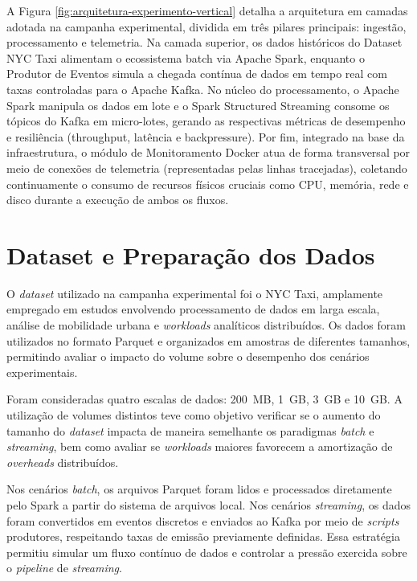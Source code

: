 A Figura \ref{fig:arquitetura-experimento-vertical} detalha a arquitetura em camadas adotada na campanha experimental, dividida em três pilares principais: ingestão, processamento e telemetria. Na camada superior, os dados históricos do Dataset NYC Taxi alimentam o ecossistema batch via Apache Spark, enquanto o Produtor de Eventos simula a chegada contínua de dados em tempo real com taxas controladas para o Apache Kafka. No núcleo do processamento, o Apache Spark manipula os dados em lote e o Spark Structured Streaming consome os tópicos do Kafka em micro-lotes, gerando as respectivas métricas de desempenho e resiliência (throughput, latência e backpressure). Por fim, integrado na base da infraestrutura, o módulo de Monitoramento Docker atua de forma transversal por meio de conexões de telemetria (representadas pelas linhas tracejadas), coletando continuamente o consumo de recursos físicos cruciais como CPU, memória, rede e disco durante a execução de ambos os fluxos.


\section{Dataset e Preparação dos Dados}
\label{sec:dataset-experimento}
 
O \textit{dataset} utilizado na campanha experimental foi o NYC Taxi, amplamente empregado em estudos envolvendo processamento de dados em larga escala, análise de mobilidade urbana e \textit{workloads} analíticos distribuídos. Os dados foram utilizados no formato Parquet e organizados em amostras de diferentes tamanhos, permitindo avaliar o impacto do volume sobre o desempenho dos cenários experimentais.
 
Foram consideradas quatro escalas de dados: 200~MB, 1~GB, 3~GB e 10~GB. A utilização de volumes distintos teve como objetivo verificar se o aumento do tamanho do \textit{dataset} impacta de maneira semelhante os paradigmas \textit{batch} e \textit{streaming}, bem como avaliar se \textit{workloads} maiores favorecem a amortização de \textit{overheads} distribuídos.
 
Nos cenários \textit{batch}, os arquivos Parquet foram lidos e processados diretamente pelo Spark a partir do sistema de arquivos local. Nos cenários \textit{streaming}, os dados foram convertidos em eventos discretos e enviados ao Kafka por meio de \textit{scripts} produtores, respeitando taxas de emissão previamente definidas. Essa estratégia permitiu simular um fluxo contínuo de dados e controlar a pressão exercida sobre o \textit{pipeline} de \textit{streaming}.
 

